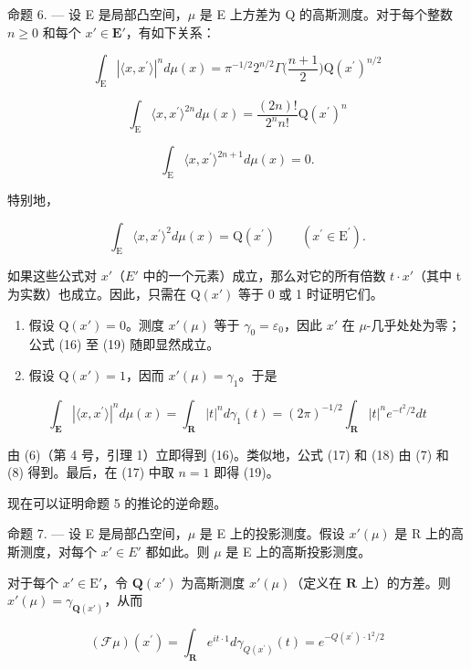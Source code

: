 命题 6. --- 设 E 是局部凸空间，\(\mu\) 是 E 上方差为 Q 的高斯测度。对于每个整数 \(n \geqslant 0\) 和每个 \(x' \in \mathbf{E}'\)，有如下关系：

\[
\int_ {\mathrm{E}} | \langle x, x ^ {\prime} \rangle | ^ {n} d \mu (x) = \pi^ {- 1 / 2} 2 ^ {n / 2} \Gamma \Big (\frac {n + 1}{2} \Big) \mathrm{Q} (x ^ {\prime}) ^ {n / 2}\tag{16}
\]

\[
\int_ {\mathrm{E}} \langle x, x ^ {\prime} \rangle^ {2 n} d \mu (x) = \frac {(2 n) !}{2 ^ {n} n !} \mathrm{Q} (x ^ {\prime}) ^ {n}\tag{17}
\]

\[
\int_ {\mathrm{E}} \langle x, x ^ {\prime} \rangle^ {2 n + 1} d \mu (x) = 0.\tag{18}
\]

特别地，

\[
\int_ {\mathrm{E}} \langle x, x ^ {\prime} \rangle^ {2} d \mu (x) = \mathrm{Q} (x ^ {\prime}) \qquad (x ^ {\prime} \in \mathrm{E} ^ {\prime}).\tag{19}
\]

如果这些公式对 \(x'\)（\(E'\) 中的一个元素）成立，那么对它的所有倍数 \(t \cdot x'\)（其中 t 为实数）也成立。因此，只需在 \(\mathrm{Q}(x')\) 等于 0 或 1 时证明它们。

\begin{enumerate}
\def\labelenumi{\alph{enumi})}
\item
  假设 \(\mathrm{Q}(x') = 0\)。测度 \(x'(\mu)\) 等于 \(\gamma_{0} = \varepsilon_{0}\)，因此 \(x'\) 在 \(\mu\)-几乎处处为零；公式 (16) 至 (19) 随即显然成立。
\item
  假设 \(\mathrm{Q}(x') = 1\)，因而 \(x'(\mu) = \gamma_{1}\)。于是
\end{enumerate}

\[
\int_ {\mathbf {E}} | \langle x, x ^ {\prime} \rangle | ^ {n} d \mu (x) = \int_ {\mathbf {R}} | t | ^ {n} d \gamma_ {1} (t) = (2 \pi) ^ {- 1 / 2} \int_ {\mathbf {R}} | t | ^ {n} e ^ {- t ^ {2} / 2} d t
\]

由 (6)（第 4 号，引理 1）立即得到 (16)。类似地，公式 (17) 和 (18) 由 (7) 和 (8) 得到。最后，在 (17) 中取 \(n = 1\) 即得 (19)。

现在可以证明命题 5 的推论的逆命题。

命题 7. --- 设 E 是局部凸空间，\(\mu\) 是 E 上的投影测度。假设 \(x'(\mu)\) 是 R 上的高斯测度，对每个 \(x' \in E'\) 都如此。则 \(\mu\) 是 E 上的高斯投影测度。

对于每个 \(x' \in \mathrm{E}'\)，令 \(\mathbf{Q}(x')\) 为高斯测度 \(x'(\mu)\)（定义在 \(\mathbf{R}\) 上）的方差。则 \(x'(\mu) = \gamma_{\mathbf{Q}(x')}\)，从而

\[
(\mathcal {F} \mu) (x ^ {\prime}) = \int_ {\mathbf {R}} e ^ {i t \cdot 1} d \gamma_ {Q (x ^ {\prime})} (t) = e ^ {- Q (x ^ {\prime}) \cdot 1 ^ {2} / 2}
\]

